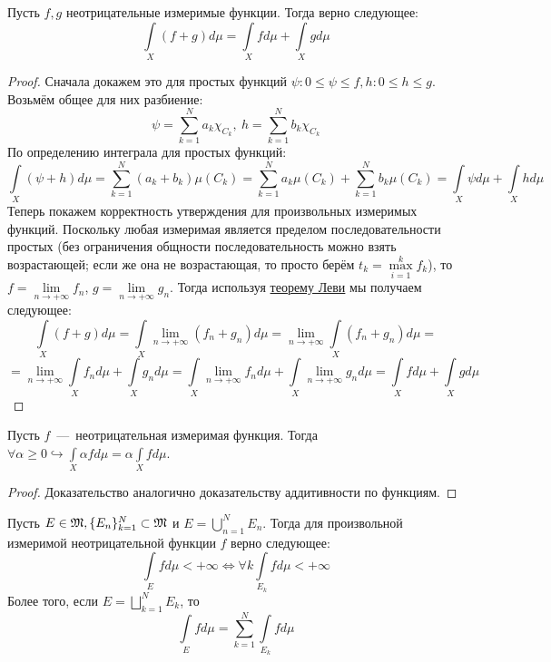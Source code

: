 \begin{proposition}
    Пусть $f, g$ неотрицательные измеримые функции. Тогда верно следующее: \[\int\limits_X (f + g) d\mu = \int\limits_X fd\mu + \int\limits_X gd\mu\]
\end{proposition}
\begin{proof}
    Сначала докажем это для простых функций $\psi: 0 \leq \psi \leq f, h: 0 \leq h \leq g$. Возьмём общее для них разбиение: \[\psi = \sum\limits_{k = 1}^N a_k \chi_{C_k}, \ h = \sum\limits_{k = 1}^N b_k \chi_{C_k}\]
    По определению интеграла для простых функций: \[\int\limits_X (\psi + h)d\mu = \sum\limits_{k = 1}^N (a_k + b_k)\mu(C_k) = \sum\limits_{k = 1}^N a_k\mu(C_k) + \sum\limits_{k = 1}^N b_k\mu(C_k) = \int\limits_X \psi d\mu + \int\limits_X h d\mu\]
    Теперь покажем корректность утверждения для произвольных измеримых функций. Поскольку любая измеримая является пределом последовательности простых (без ограничения общности последовательность можно взять возрастающей; если же она не возрастающая, то просто берём $t_k = \max\limits_{i = 1}^k f_k$), то $f = \lim\limits_{n\rightarrow +\infty} f_n$, $g = \lim\limits_{n \rightarrow +\infty} g_n$. Тогда используя \hyperlink{beppo_levi}{теорему Леви} мы получаем следующее:     
    \[\int\limits_X (f + g)d\mu = \int\limits_X \lim\limits_{n\rightarrow +\infty} (f_n + g_n) d\mu = \lim\limits_{n \rightarrow + \infty} \int\limits_X (f_n + g_n)d\mu = \]\[ = \lim\limits_{n\rightarrow +\infty} \int\limits_X f_nd\mu + \int\limits_X g_nd\mu = \int\limits_X \lim\limits_{n \rightarrow +\infty} f_nd\mu + \int\limits_X \lim\limits_{n \rightarrow +\infty} g_nd\mu = \int\limits_X fd\mu + \int\limits_X gd\mu\]
\end{proof}
\begin{proposition}
    Пусть $f$~---~неотрицательная измеримая функция. Тогда $\forall \alpha \geq 0 \hookrightarrow \int\limits_X \alpha f d\mu = \alpha \int\limits_X fd\mu$.
\end{proposition}
\begin{proof}
    Доказательство аналогично доказательству аддитивности по функциям.
\end{proof}
\begin{proposition}
    Пусть $E \in \mathfrak{M}, \{E_n\}_{k = 1}^N \subset \mathfrak{M}$ и $E = \bigcup\limits_{n = 1}^N E_n$. Тогда для произвольной измеримой неотрицательной функции $f$ верно следующее: \[\int\limits_E fd\mu < +\infty \Longleftrightarrow \forall k \int\limits_{E_k} fd\mu < +\infty\]
    Более того, если $E = \bigsqcup\limits_{k = 1}^N E_k$, то \[\int\limits_E fd\mu = \sum\limits_{k = 1}^N \int\limits_{E_k} fd\mu\]
\end{proposition}

